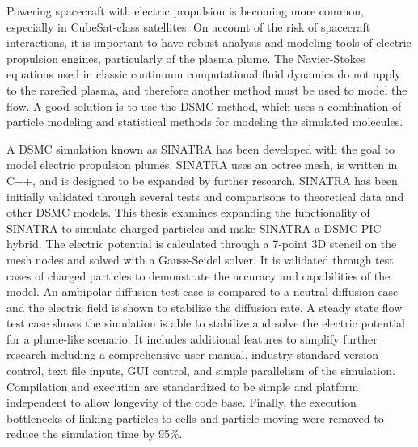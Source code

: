 Powering spacecraft with electric propulsion is becoming more common, especially in CubeSat-class satellites. On account of the risk of spacecraft interactions, it is important to have robust analysis and modeling tools of electric propulsion engines, particularly of the plasma plume. The Navier-Stokes equations used in classic continuum computational fluid dynamics do not apply to the rarefied plasma, and therefore another method must be used to model the flow. A good solution is to use the DSMC method, which uses a combination of particle modeling and statistical methods for modeling the simulated molecules. 

A DSMC simulation known as SINATRA has been developed with the goal to model electric propulsion plumes. SINATRA uses an octree mesh, is written in C++, and is designed to be expanded by further research. SINATRA has been initially validated through several tests and comparisons to theoretical data and other DSMC models. This thesis examines expanding the functionality of SINATRA to simulate charged particles and make SINATRA a DSMC-PIC hybrid. The electric potential is calculated through a 7-point 3D stencil on the mesh nodes and solved with a Gauss-Seidel solver. It is validated through test cases of charged particles to demonstrate the accuracy and capabilities of the model. An ambipolar diffusion test case is compared to a neutral diffusion case and the electric field is shown to stabilize the diffusion rate. A steady state flow test case shows the simulation is able to stabilize and solve the electric potential for a plume-like scenario. It includes additional features to simplify further research including  a comprehensive user manual, industry-standard version control, text file inputs, GUI control, and simple parallelism of the simulation. Compilation and execution are standardized to be simple and platform independent to allow longevity of the code base. Finally, the execution bottlenecks of linking particles to cells and particle moving were removed to reduce the simulation time by 95\%. 
